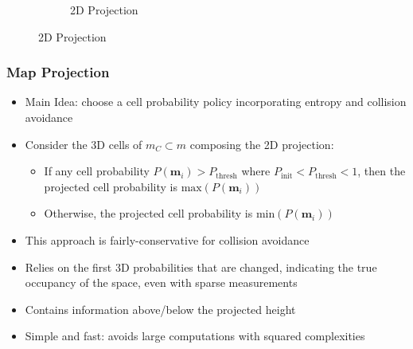 \documentclass[11pt,professionalfonts,hyperref={pdftex,pdfpagemode=none,pdfstartview=FitH}]{beamer}
\begin{document}
\begin{frame}
\begin{itemize}
\begin{itemize}
\begin{figure}
\begin{subfigure}[t]{.3\linewidth}
    \caption*{2D Projection}
  \end{subfigure}
\end{figure}
	\end{itemize}
\end{itemize}

\end{frame}

\begin{frame}
\frametitle{Map Projection}

\begin{itemize}
	\item Main Idea: choose a cell probability policy incorporating entropy and collision avoidance
		\vspace*{0.0cm}\pause
	\item Consider the 3D cells of $m_C\subset m$ composing the 2D projection:
	\begin{itemize}
		\item If any cell probability $P(\mathbf{m}_i)>P_\text{thresh}$ where $P_\text{init}<P_\text{thresh}<1$, then the projected cell probability is $\text{max}(P(\mathbf{m}_i))$
		\item Otherwise, the projected cell probability is $\text{min}(P(\mathbf{m}_i))$
	\end{itemize}
		\vspace*{0.0cm}\pause
	\item This approach is fairly-conservative for collision avoidance
	\item Relies on the first 3D probabilities that are changed, indicating the true occupancy of the space, even with sparse measurements
	\item Contains information above/below the projected height
	\item Simple and fast: avoids large computations with squared complexities
\end{itemize}

\end{frame}
\end{document}
